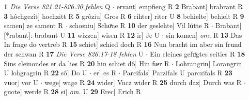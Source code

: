 \documentclass[8pt,a4paper,notitlepage]{article}
\begin{document}
\begin{table}[ht]
\begin{minipage}[t]{0.5\linewidth}
\textbf{1} \textit{Die Verse 821.21-826.30 fehlen} Q   $\cdot$ ervant] empfieng R \textbf{2} Brabant] brabrant R \textbf{3} hôchgezît] hochzitt R \textbf{5} grôziu] Gros R \textbf{6} rihter] riter U \textbf{8} behielte] behielt R \textbf{9} samen] ze sament R  $\cdot$ schœniu] Schoͯne R \textbf{10} der geslehte] Vil lútte R  $\cdot$ Brabant] [*rabant]: brabant U \textbf{11} wizzen] wisen R \textbf{12} ir] Je U  $\cdot$ sîn komen] \textit{om.} R \textbf{13} Das In frage do vertreb R \textbf{15} schiet] schied doch R \textbf{16} Nun bracht im aber sin frund der schwan R \textbf{17} \textit{Die Verse 826.17-18 fehlen} U   $\cdot$ Ein cleines gefuͯgtes seities R \textbf{18} Sins cleinondes er da lies R \textbf{20} hin schiet dô] Hin fᵫr R  $\cdot$ Lohrangrin] Lorangrin U lohgragrin R \textbf{22} sô] Do U  $\cdot$ er] es R  $\cdot$ Parcifals] Parzifals U parczifals R \textbf{23} vuor] vor U  $\cdot$ wege] wage R \textbf{24} wider] Vncz wider R \textbf{25} durch daz] Durch was R  $\cdot$ guote] werde R \textbf{28} si] \textit{om.} U \textbf{29} Erec] Erich R \newline
\end{minipage}
\end{table}
\end{document}
